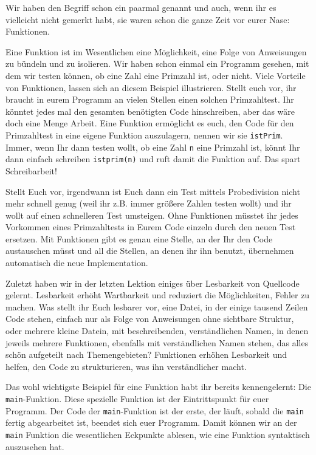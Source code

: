 
Wir haben den Begriff schon ein paarmal genannt und auch, wenn ihr es vielleicht
nicht gemerkt habt, sie waren schon die ganze Zeit vor eurer Nase: Funktionen.

Eine Funktion ist im Wesentlichen eine Möglichkeit, eine Folge von Anweisungen
zu bündeln und zu isolieren. Wir haben schon einmal ein Programm gesehen, mit
dem wir testen können, ob eine Zahl eine Primzahl ist, oder nicht. Viele
Vorteile von Funktionen, lassen sich an diesem Beispiel illustrieren. Stellt
euch vor, ihr braucht in eurem Programm an vielen Stellen einen solchen
Primzahltest. Ihr könntet jedes mal den gesamten benötigten Code hinschreiben,
aber das wäre doch eine Menge Arbeit. Eine Funktion ermöglicht es euch, den Code
für den Primzahltest in eine eigene Funktion auszulagern, nennen wir
sie \texttt{istPrim}. Immer, wenn Ihr dann testen wollt, ob eine Zahl \texttt{n}
eine Primzahl ist, könnt Ihr dann einfach schreiben \texttt{istprim(n)} und ruft
damit die Funktion auf. Das spart Schreibarbeit!

Stellt Euch vor, irgendwann ist Euch dann ein Test mittels Probedivision nicht
mehr schnell genug (weil ihr z.B. immer größere Zahlen testen wollt) und ihr
wollt auf einen schnelleren Test umsteigen. Ohne Funktionen müsstet ihr jedes
Vorkommen eines Primzahltests in Eurem Code einzeln durch den neuen Test
ersetzen. Mit Funktionen gibt es genau eine Stelle, an der Ihr den Code
austauschen müsst und all die Stellen, an denen ihr ihn benutzt, übernehmen
automatisch die neue Implementation.

Zuletzt haben wir in der letzten Lektion einiges über Lesbarkeit von Quellcode
gelernt. Lesbarkeit erhöht Wartbarkeit und reduziert die Möglichkeiten, Fehler
zu machen. Was stellt ihr Euch lesbarer vor, eine Datei, in der einige tausend
Zeilen Code stehen, einfach nur als Folge von Anweisungen ohne sichtbare
Struktur, oder mehrere kleine Datein, mit beschreibenden, verständlichen Namen,
in denen jeweils mehrere Funktionen, ebenfalls mit verständlichen Namen stehen,
das alles schön aufgeteilt nach Themengebieten? Funktionen erhöhen Lesbarkeit
und helfen, den Code zu strukturieren, was ihn verständlicher macht.

Das wohl wichtigste Beispiel für eine Funktion habt ihr bereits kennengelernt:
Die \texttt{main}-Funktion. Diese spezielle Funktion ist der Eintrittspunkt für
euer Programm. Der Code der \texttt{main}-Funktion ist der erste, der läuft,
sobald die \texttt{main} fertig abgearbeitet ist, beendet sich euer Programm.
Damit können wir an der \texttt{main} Funktion die wesentlichen Eckpunkte
ablesen, wie eine Funktion syntaktisch auszusehen hat.

